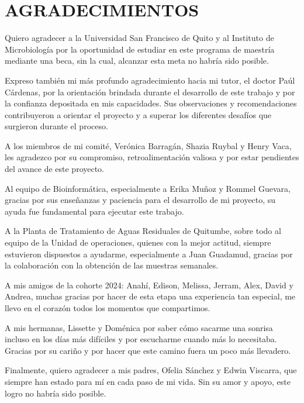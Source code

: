\section*{AGRADECIMIENTOS}

Quiero agradecer a la Universidad San Francisco de Quito y al Instituto de Microbiología por la oportunidad de estudiar en este programa de maestría mediante una beca, sin la cual, alcanzar esta meta no habría sido posible.

Expreso también mi más profundo agradecimiento hacia mi tutor, el doctor Paúl Cárdenas, por la orientación brindada durante el desarrollo de este trabajo y por la confianza depositada en mis capacidades. Sus observaciones y recomendaciones contribuyeron a orientar el proyecto y a superar los diferentes desafíos que surgieron durante el proceso. 

A los miembros de mi comité, Verónica Barragán, Shazia Ruybal y Henry Vaca, les agradezco por su compromiso, retroalimentación valiosa y por estar pendientes del avance de este proyecto.

Al equipo de Bioinformática, especialmente a Erika Muñoz y Rommel Guevara, gracias por sus enseñanzas y paciencia para el desarrollo de mi proyecto, su ayuda fue fundamental para ejecutar este trabajo.

A la Planta de Tratamiento de Aguas Residuales de Quitumbe, sobre todo al equipo de la Unidad de operaciones, quienes con la mejor actitud, siempre estuvieron dispuestos a ayudarme, especialmente a Juan Guadamud, gracias por la colaboración con la obtención de las muestras semanales. 

A mis amigos de la cohorte 2024: Anahí, Edison, Melissa, Jerram, Alex, David y Andrea, muchas gracias por hacer de esta etapa una experiencia tan especial, me llevo en el corazón todos los momentos que compartimos. 

A mis hermanas, Lissette y Doménica por saber cómo sacarme una sonrisa incluso en los días más difíciles y por escucharme cuando más lo necesitaba. Gracias por su cariño y por hacer que este camino fuera un poco más llevadero.

Finalmente, quiero agradecer a mis padres, Ofelia Sánchez y Edwin Viscarra, que siempre han estado para mí en cada paso de mi vida. Sin su amor y apoyo, este logro no habría sido posible. 

